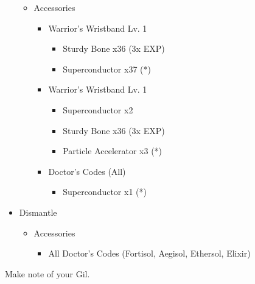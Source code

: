 \begin{paracol}{2}
\begin{upgrade}
\begin{itemize}
\begin{itemize}
\begin{itemize}
				            \end{itemize}
				      \item Accessories
				            \begin{itemize}
					            \item Warrior's Wristband Lv. 1
					                  \begin{itemize}
						                  \item Sturdy Bone x36 (3x EXP)
						                  \item Superconductor x37 (*)
					                  \end{itemize}
					            \item Warrior's Wristband Lv. 1
					                  \begin{itemize}
						                  \item Superconductor x2
						                  \item Sturdy Bone x36 (3x EXP)
						                  \item Particle Accelerator x3 (*)
					                  \end{itemize}
					            \item Doctor's Codes (All)
					                  \begin{itemize}
						                  \item Superconductor x1 (*)
					                  \end{itemize}
				            \end{itemize}
			      \end{itemize}
			\item Dismantle
			      \begin{itemize}
				      \item Accessories
				            \begin{itemize}
					            \item All Doctor's Codes (Fortisol, Aegisol, Ethersol, Elixir)
				            \end{itemize}
			      \end{itemize}
		\end{itemize}
	\end{upgrade}
	Make note of your Gil.


\end{paracol}

